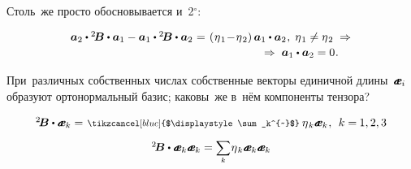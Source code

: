\begin{otherlanguage}{russian}
Столь~же просто обосновывается и~2$^{\circ}$:

\nopagebreak\vspace{-0.1em}\begin{equation*}\begin{array}{c}
\tikzmark{BeginEqualsZeroBrace} {\bm{a}_2 \dotp {^2\!\bm{B}} \dotp \bm{a}_1 - \bm{a}_1 \dotp {^2\!\bm{B}} \dotp \bm{a}_2} \hspace{.1ex} \tikzmark{EndEqualsZeroBrace} = \hspace{.2ex} \left(\hspace{.1ex}{\eigenvalue_1 \!-\! \eigenvalue_2}\right) \bm{a}_1 \dotp \bm{a}_2 \hspace{.1ex} , \;
\eigenvalue_1 \neq \eigenvalue_2 \;\Rightarrow \\[0.2em]
\hspace{16em} \Rightarrow\; \bm{a}_1 \dotp \bm{a}_2 = 0 \hspace{.1ex}.
\end{array}\end{equation*}

\vspace{-0.64em} При~различных собственных числах собственные векторы единичной длины~${\mathboldae_i}$ образуют ортонормальный базис; каковы~же в~нём компоненты тензора?

\vspace{-0.1em}\[\begin{array}{c}
{^2\!\bm{B}} \dotp \mathboldae_k = \hspace{0.2ex} \scalebox{0.8}[0.8]{$\tikzcancel[blue]{$\displaystyle\sum_k^{~}$}$}\: \eigenvalue_k \mathboldae_k \hspace{0.1ex}, \:\: k =\hspace{-0.1ex} 1, 2, 3 \\[.9em]
%
{^2\!\bm{B}} \dotp \tikzmark{BeginEqualsEBrace} {\mathboldae_k \mathboldae_k} \tikzmark{EndEqualsEBrace} = \scalebox{0.9}[0.9]{$\displaystyle \sum_{\smash{k}}$} \hspace{0.1ex} \eigenvalue_k \mathboldae_k \mathboldae_k
\end{array}\]


\end{otherlanguage}
